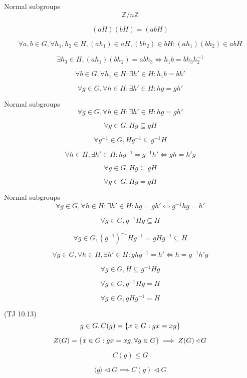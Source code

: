 \begin{frame}{Normal subgroups}
  \[
    \mathbb{Z}/n\mathbb{Z}
  \]

  \[
    (aH) (bH) = (abH)
  \]

  \[
  \forall a, b \in G, \forall h_1, h_2 \in H, (ah_1) \in aH, (bh_2) \in bH: (ah_1)(bh_2) \in abH
  \]

  \[
    \exists h_3 \in H, (ah_1)(bh_2) = abh_3 \iff h_1 b = bh_3h_2^{-1}
  \]

  \[
    \forall b \in G, \forall h_1 \in H: \exists h' \in H: h_1 b = bh'
  \]

  \[
    \forall g \in G, \forall h \in H: \exists h' \in H: hg = gh'
  \]
\end{frame}
\begin{frame}{Normal subgroups}
  \[
    \forall g \in G, \forall h \in H: \exists h' \in H: hg = gh'
  \]

  \[
    \forall g \in G, Hg \subseteq gH
  \]

  \[
    \forall g^{-1} \in G, Hg^{-1} \subseteq g^{-1}H
  \]

  \[
    \forall h \in H, \exists h' \in H: hg^{-1} = g^{-1}h' \iff gh = h'g
  \]

  \[
    \forall g \in G,  Hg \subseteq gH
  \]

  \[
    \forall g \in G,  Hg = gH
  \]
\end{frame}
\begin{frame}{Normal subgroups}
  \[
    \forall g \in G, \forall h \in H: \exists h' \in H: hg = gh' \iff g^{-1}hg = h'
  \]

  \[
    \forall g \in G, g^{-1}Hg \subseteq H
  \]

  \[
    \forall g \in G, (g^{-1})^{-1}Hg^{-1} = gHg^{-1} \subseteq H
  \]

  \[
   \forall g \in G, \forall h \in H, \exists h' \in H: ghg^{-1} = h' \iff h = g^{-1}h'g
  \]

  \[
    \forall g \in G, H \subseteq g^{-1}Hg
  \]

  \[
    \forall g \in G, g^{-1}Hg = H
  \]

  \[
    \forall g \in G, gHg^{-1} = H
  \]
\end{frame}
\begin{frame}{(TJ 10.13)}
  \[
    g \in G, C(g) = \{x \in G: gx = xg\}
  \]

  \[
    Z(G) = \{x \in G: gx = xg,  \forall g \in G\} \implies Z(G) \triangleleft G
  \]

  \[
    C(g) \le G
  \]

  \[
    \langle g \rangle \triangleleft G \implies C(g) \triangleleft G
  \]
\end{frame}

